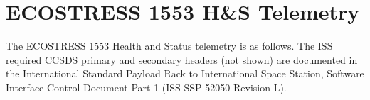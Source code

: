 \section{ECOSTRESS 1553 H\&S Telemetry}

The ECOSTRESS 1553 Health and Status telemetry is as follows.  The ISS
required CCSDS primary and secondary headers (not shown) are
documented in the International Standard Payload Rack to International
Space Station, Software Interface Control Document Part 1 (ISS SSP
52050 Revision L).
